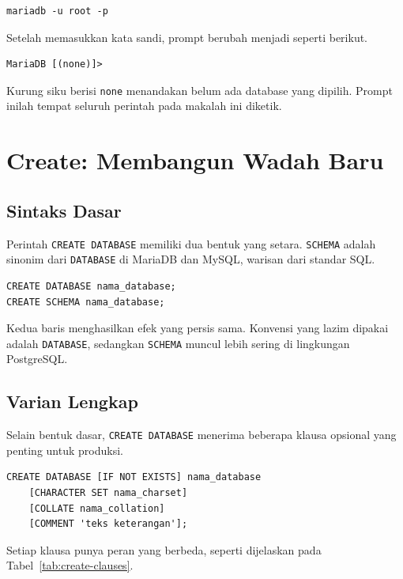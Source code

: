 \documentclass[11pt,a4paper]{article}
\begin{document}
\begin{lstlisting}[style=code]
mariadb -u root -p
\end{lstlisting}

Setelah memasukkan kata sandi, prompt berubah menjadi seperti berikut.

\begin{lstlisting}[style=out]
MariaDB [(none)]>
\end{lstlisting}

Kurung siku berisi \texttt{none} menandakan belum ada database yang dipilih. Prompt inilah tempat seluruh perintah pada makalah ini diketik.

\section{Create: Membangun Wadah Baru}

\subsection{Sintaks Dasar}

Perintah \texttt{CREATE DATABASE} memiliki dua bentuk yang setara. \texttt{SCHEMA} adalah sinonim dari \texttt{DATABASE} di MariaDB dan MySQL, warisan dari standar SQL.

\begin{lstlisting}[style=code]
CREATE DATABASE nama_database;
CREATE SCHEMA nama_database;
\end{lstlisting}

Kedua baris menghasilkan efek yang persis sama. Konvensi yang lazim dipakai adalah \texttt{DATABASE}, sedangkan \texttt{SCHEMA} muncul lebih sering di lingkungan PostgreSQL.

\subsection{Varian Lengkap}

Selain bentuk dasar, \texttt{CREATE DATABASE} menerima beberapa klausa opsional yang penting untuk produksi.

\begin{lstlisting}[style=code]
CREATE DATABASE [IF NOT EXISTS] nama_database
    [CHARACTER SET nama_charset]
    [COLLATE nama_collation]
    [COMMENT 'teks keterangan'];
\end{lstlisting}

Setiap klausa punya peran yang berbeda, seperti dijelaskan pada Tabel~\ref{tab:create-clauses}.
\end{document}
